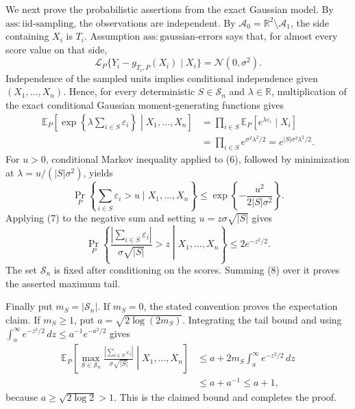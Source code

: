 We next prove the probabilistic assertions from the exact Gaussian model.  By \(\mathrm{ass:iid\text{-}sampling}\), the observations are independent.  By \(\mathcal A_0=\mathbb R^2\setminus\mathcal A_1\), the side containing \(X_i\) is \(T_i\).  Assumption \(\mathrm{ass:gaussian\text{-}errors}\) says that, for almost every score value on that side,
\[
 \mathcal L_P\{Y_i-g_{T_i,P}(X_i)\mid X_i\}=\mathcal N(0,\sigma^2). \tag{5}
\]
Independence of the sampled units implies conditional independence given \((X_1,\ldots,X_n)\).  Hence, for every deterministic \(S\in\mathscr S_n\) and \(\lambda\in\mathbb R\), multiplication of the exact conditional Gaussian moment-generating functions gives
\[
\begin{aligned}
 \mathbb E_P\left[\exp\left\{\lambda\sum_{i\in S}\varepsilon_i\right\}
       \middle|X_1,\ldots,X_n\right]
 &=\prod_{i\in S}\mathbb E_P\left[e^{\lambda\varepsilon_i}\mid X_i\right]\\
 &=\prod_{i\in S}e^{\sigma^2\lambda^2/2}
 =e^{|S|\sigma^2\lambda^2/2}. \tag{6}
\end{aligned}
\]
For \(u>0\), conditional Markov inequality applied to (6), followed by minimization at \(\lambda=u/(|S|\sigma^2)\), yields
\[
 \Pr_P\left\{\sum_{i\in S}\varepsilon_i>u\mid X_1,\ldots,X_n\right\}
 \le \exp\left\{-\frac{u^2}{2|S|\sigma^2}\right\}. \tag{7}
\]
Applying (7) to the negative sum and setting \(u=z\sigma\sqrt{|S|}\) gives
\[
 \Pr_P\left\{\frac{|\sum_{i\in S}\varepsilon_i|}{\sigma\sqrt{|S|}}>z
       \middle|X_1,\ldots,X_n\right\}\le2e^{-z^2/2}. \tag{8}
\]
The set \(\mathscr S_n\) is fixed after conditioning on the scores.  Summing (8) over it proves the asserted maximum tail.

Finally put \(m_S=|\mathscr S_n|\).  If \(m_S=0\), the stated convention proves the expectation claim.  If \(m_S\ge1\), put \(a=\sqrt{2\log(2m_S)}\).  Integrating the tail bound and using \(\int_a^\infty e^{-z^2/2}\,dz\le a^{-1}e^{-a^2/2}\) gives
\[
\begin{aligned}
 \mathbb E_P\left[\max_{S\in\mathscr S_n}
 \frac{|\sum_{i\in S}\varepsilon_i|}{\sigma\sqrt{|S|}}
 \middle|X_1,\ldots,X_n\right]
 &\le a+2m_S\int_a^\infty e^{-z^2/2}\,dz\\
 &\le a+a^{-1}\le a+1, \tag{9}
\end{aligned}
\]
because \(a\ge\sqrt{2\log2}>1\).  This is the claimed bound and completes the proof.